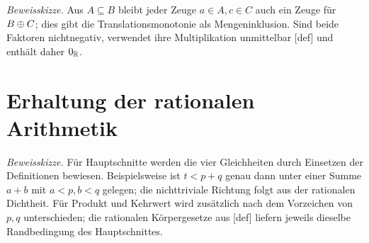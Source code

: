 \documentclass[main.tex]{subfiles}
\begin{document}

\emph{Beweisskizze.}
Aus \(A\subseteq B\) bleibt jeder Zeuge \(a\in A,c\in C\) auch ein Zeuge für
\(B\mathbin{\oplus} C\); dies gibt die Translationsmonotonie als Mengeninklusion. Sind
beide Faktoren nichtnegativ, verwendet ihre Multiplikation unmittelbar
[def] und enthält daher
\(0_{\mathbb R}\).

\section{Erhaltung der rationalen Arithmetik}


\emph{Beweisskizze.}
Für Hauptschnitte werden die vier Gleichheiten durch Einsetzen der
Definitionen bewiesen. Beispielsweise ist \(t<p+q\) genau dann unter einer
Summe \(a+b\) mit \(a<p,b<q\) gelegen; die nichttriviale Richtung folgt aus
der rationalen Dichtheit. Für Produkt und Kehrwert wird zusätzlich nach dem
Vorzeichen von \(p,q\) unterschieden; die rationalen Körpergesetze aus
[def] liefern jeweils dieselbe
Randbedingung des Hauptschnittes.
\end{document}
